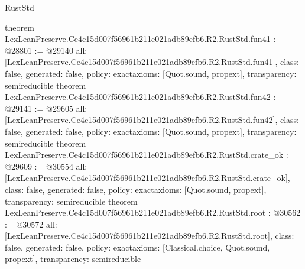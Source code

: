 \begin{lexlean}{RustStd}
\begin{coremodule}
{}
theorem LexLeanPreserve.Ce4c15d007f56961b211e021adb89efb6.R2.RustStd.fun41 : @28801 := @29140 {
  all: [LexLeanPreserve.Ce4c15d007f56961b211e021adb89efb6.R2.RustStd.fun41],
  class: false,
  generated: false,
  policy: exact{axioms: [Quot.sound, propext]},
  transparency: semireducible
}
theorem LexLeanPreserve.Ce4c15d007f56961b211e021adb89efb6.R2.RustStd.fun42 : @29141 := @29605 {
  all: [LexLeanPreserve.Ce4c15d007f56961b211e021adb89efb6.R2.RustStd.fun42],
  class: false,
  generated: false,
  policy: exact{axioms: [Quot.sound, propext]},
  transparency: semireducible
}
theorem LexLeanPreserve.Ce4c15d007f56961b211e021adb89efb6.R2.RustStd.crate_ok : @29609 := @30554 {
  all: [LexLeanPreserve.Ce4c15d007f56961b211e021adb89efb6.R2.RustStd.crate_ok],
  class: false,
  generated: false,
  policy: exact{axioms: [Quot.sound, propext]},
  transparency: semireducible
}
theorem LexLeanPreserve.Ce4c15d007f56961b211e021adb89efb6.R2.RustStd.root : @30562 := @30572 {
  all: [LexLeanPreserve.Ce4c15d007f56961b211e021adb89efb6.R2.RustStd.root],
  class: false,
  generated: false,
  policy: exact{axioms: [Classical.choice, Quot.sound, propext]},
  transparency: semireducible
}


\end{coremodule}
\end{lexlean}
